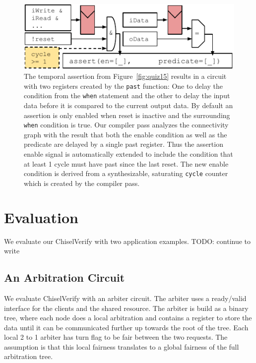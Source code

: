 \documentclass[conference]{IEEEtran}
\newcommand\scalainline[1]{\texttt{#1}}
\newcommand{\todo}[1]{{\color{olive} TODO: #1}}
\begin{document}
\begin{figure}[b]
\centering
\includegraphics{woset_safe_past.pdf}
\caption{The temporal assertion from Figure~\ref{fig:quiz15} results in a circuit with two registers created by the \scalainline{past} function:
One to delay the condition from the \scalainline{when} statement and the other to delay the input data before it is compared to the current output data.
By default an assertion is only enabled when reset is inactive and the surrounding \scalainline{when} condition is true.
Our compiler pass analyzes the connectivity graph with the result that both the enable condition as well as the predicate are delayed by a single past register.
Thus the assertion enable signal is automatically extended to include the condition that at least 1 cycle must have past since the last reset.
The new enable condition is derived from a synthesizable, saturating \scalainline{cycle} counter which is created by the compiler pass.
}
\label{fig:past}
\end{figure}





\section{Evaluation}

We evaluate our ChiselVerify with two application examples. \todo{continue to write}

\subsection{An Arbitration Circuit}

We evaluate ChiselVerify with an arbiter circuit. The arbiter uses a ready/valid interface for the clients
and the shared resource. The arbiter is build as a binary tree, where each node does a local arbitration
and contains a register to store the data until it can be communicated further up towards the root of the
tree. Each local 2 to 1 arbiter has turn flag to be fair between the two requests. The assumption is that
this local fairness translates to a global fairness of the full arbitration tree.
\end{document}
